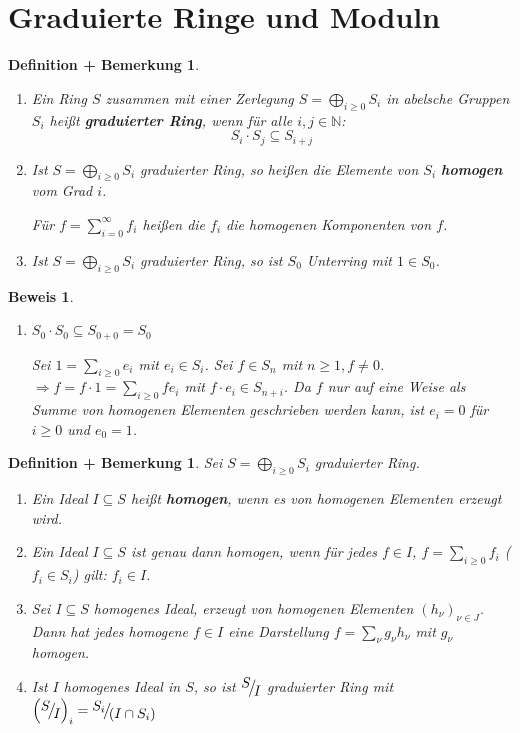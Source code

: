 \documentclass[a4paper,12pt]{scrbook}
\theoremstyle{break}
\newtheorem{DefBem}[Def]{Definition + Bemerkung}
\theoremstyle{nonumberbreak}
\newtheorem{Bew}{Beweis}
\theoremstyle{nonumberplain}
\newcommand{\emp}[1]{\textbf{\emph{#1}}}
\newcommand{\FakRaum}[2]{
  \raisebox{0.7ex}{\ensuremath{#1}}
  \ensuremath{\mkern-3mu}\big/\ensuremath{\mkern-3mu}
  \raisebox{-0.6ex}{\ensuremath{#2}}}
\begin{document}
\section{Graduierte Ringe und Moduln}

\begin{DefBem}
\label{2.13}

\begin{enumerate}

\item Ein Ring $S$ zusammen mit einer Zerlegung $S=\bigoplus_{i\geq 0}S_i$
in abelsche Gruppen $S_i$ heißt \emp{graduierter Ring}, wenn für alle $i, j\in \mathbb{N}$:
$$S_i\cdot S_j\subseteq S_{i+j}$$

\item Ist $S=\bigoplus_{i\geq 0} S_i$ graduierter Ring, so heißen die Elemente
von $S_i$ \emp{homogen} vom Grad $i$.

Für $f=\sum_{i=0}^{\infty} f_i$ heißen die $f_i$ die homogenen Komponenten von $f$.

\item Ist $S=\bigoplus_{i\geq 0} S_i$ graduierter Ring, so ist $S_0$ Unterring mit $1\in S_0$.
\end{enumerate}

\end{DefBem}

\begin{Bew}
\begin{enumerate}
\item[(c)] $S_0\cdot S_0\subseteq S_{0+0}=S_0$

Sei $1=\sum_{i\geq 0}e_i$ mit $e_i\in S_i$. Sei $f\in S_n$ mit $n\geq 1, f\neq 0$.
$\Rightarrow f=f\cdot 1 = \sum_{i\geq 0}fe_i$ mit $f\cdot e_i\in S_{n+i}$.
Da $f$ nur auf eine Weise als Summe von homogenen Elementen geschrieben werden
kann, ist $e_i=0$ für $i\geq 0$ und $e_0=1$.
\end{enumerate}
\end{Bew}

\begin{DefBem}
\label{2.14}
Sei $S=\bigoplus_{i\geq 0} S_i$ graduierter Ring.
\begin{enumerate}

\item Ein Ideal $I\subseteq S$ heißt \emp{homogen}, wenn es von homogenen Elementen erzeugt wird.

\item Ein Ideal $I\subseteq S$ ist genau dann homogen, wenn
für jedes $f\in I$, $f=\sum_{i\geq 0} f_i$ ($f_i\in S_i$) gilt: $f_i\in I$.

\item Sei $I\subseteq S$ homogenes Ideal, erzeugt von homogenen Elementen $(h_\nu)_{\nu\in J}$.
Dann hat jedes homogene $f\in I$ eine Darstellung $f=\sum_{\nu}g_\nu h_\nu$ mit $g_\nu$ 
homogen.

\item Ist $I$ homogenes Ideal in $S$, so ist $\FakRaum{S}{I}$ graduierter Ring mit $\left(\FakRaum{S}{I}\right)_i = \FakRaum{S_i}{(I\cap S_i)}$

\end{enumerate}
\end{DefBem}
\end{document}

